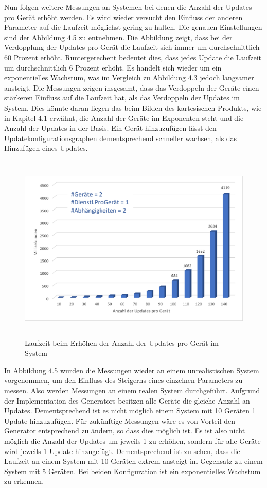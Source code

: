 \newpage
Nun folgen weitere Messungen an Systemen bei denen die Anzahl der Updates pro Gerät erhöht werden. Es wird wieder versucht den Einfluss der anderen Parameter auf
die Laufzeit möglichst gering zu halten. Die genauen Einstellungen sind der Abbildung 4.5 zu entnehmen.
Die Abbildung zeigt, dass bei der Verdopplung der Updates pro Gerät die Laufzeit sich immer um durchschnittlich 60 Prozent erhöht. Runtergerechent bedeutet dies, dass jedes Update
die Laufzeit um durchschnittlich 6 Prozent erhöht. Es handelt sich wieder um ein exponentielles Wachstum, was im Vergleich zu Abbildung 4.3 jedoch langsamer ansteigt. Die Messungen
zeigen insgesamt, dass das Verdoppeln der Geräte einen stärkeren Einfluss auf die Laufzeit hat, als das Verdoppeln der Updates im System. 
Dies könnte daran liegen das beim Bilden des kartesischen Produkts, wie in Kapitel 4.1 erwähnt, die Anzahl der Geräte im Exponenten steht und die Anzahl der Updates in der Basis.
Ein Gerät hinzuzufügen lässt den Updatekonfigurationsgraphen dementsprechend schneller wachsen, als das Hinzufügen eines Updates.
\FloatBarrier
\begin{figure}[h]
\begin{center}
\includegraphics[width=14cm,height=9cm]{"Steigende Updatezahl"}
\caption{Laufzeit beim Erhöhen der Anzahl der Updates pro Gerät im System}
\label{fig:Prob1:MEA}
\end{center}
\end{figure}
\newpage
In Abbildung 4.5 wurden die Messungen wieder an einem unrealistischen System vorgenommen, um den Einfluss des Steigerns eines einzelnen Parameters zu messen. 
Also werden Messungen an einem realen System durchgeführt. Aufgrund der Implementation des Generators besitzen alle Geräte die gleiche Anzahl
an Updates. Dementsprechend ist es nicht möglich einem System mit 10 Geräten 1 Update hinzuzufügen. Für zukünftige Messungen wäre es von Vorteil
den Generator entsprechend zu ändern, so dass dies möglich ist. Es ist also nicht möglich die Anzahl der Updates um jeweils 1 zu erhöhen, sondern für
alle Geräte wird jeweils 1 Update hinzugefügt. Dementsprechend ist zu sehen, dass die Laufzeit an einem System mit 10 Geräten extrem ansteigt im Gegensatz
zu einem System mit 5 Geräten. Bei beiden Konfiguration ist ein exponentielles Wachstum zu erkennen.

